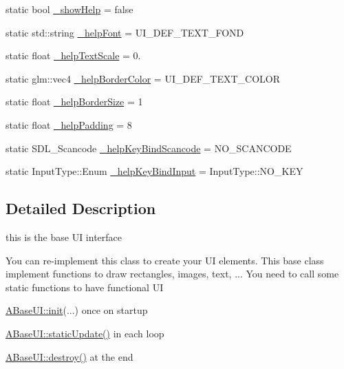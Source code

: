 \begin{DoxyCompactItemize}
\item 
static bool \hyperlink{class_a_base_u_i_a0ffcefb425937777478e713fcedf8426}{\+\_\+show\+Help} = false
\item 
static std\+::string \hyperlink{class_a_base_u_i_a0949a29cbf0c6ea91325ad2c237cdd57}{\+\_\+help\+Font} = U\+I\+\_\+\+D\+E\+F\+\_\+\+T\+E\+X\+T\+\_\+\+F\+O\+ND
\item 
static float \hyperlink{class_a_base_u_i_ac4eec981613b63417248df42abaecc62}{\+\_\+help\+Text\+Scale} = 0.
\item 
static glm\+::vec4 \hyperlink{class_a_base_u_i_ae8dce878e15f755b18abe401da5298fe}{\+\_\+help\+Border\+Color} = U\+I\+\_\+\+D\+E\+F\+\_\+\+T\+E\+X\+T\+\_\+\+C\+O\+L\+OR
\item 
static float \hyperlink{class_a_base_u_i_ae28d5cb5573923e084c824eaead9aa84}{\+\_\+help\+Border\+Size} = 1
\item 
static float \hyperlink{class_a_base_u_i_a6628731a3940f1ee86aa8be1cd86698e}{\+\_\+help\+Padding} = 8
\item 
static S\+D\+L\+\_\+\+Scancode \hyperlink{class_a_base_u_i_ad9ceb29f36012070ae56aa6132a2877e}{\+\_\+help\+Key\+Bind\+Scancode} = N\+O\+\_\+\+S\+C\+A\+N\+C\+O\+DE
\item 
static Input\+Type\+::\+Enum \hyperlink{class_a_base_u_i_ab038d21ee135ab11202d23ee87a60cab}{\+\_\+help\+Key\+Bind\+Input} = Input\+Type\+::\+N\+O\+\_\+\+K\+EY
\end{DoxyCompactItemize}


\subsection{Detailed Description}
this is the base UI interface 

You can re-\/implement this class to create your UI elements. This base class implement functions to draw rectangles, images, text, ... You need to call some static functions to have functional UI
\begin{DoxyItemize}
\item \hyperlink{class_a_base_u_i_a6ddd4c5f9808ccf2c76dc1b22f482a09}{A\+Base\+U\+I\+::init}(...) once on startup
\item \hyperlink{class_a_base_u_i_a71134720c986e99b086a257eef3959ed}{A\+Base\+U\+I\+::static\+Update()} in each loop
\item \hyperlink{class_a_base_u_i_aff73dc314c8cbb5764c27462f0e5e887}{A\+Base\+U\+I\+::destroy()} at the end 
\end{DoxyItemize}

